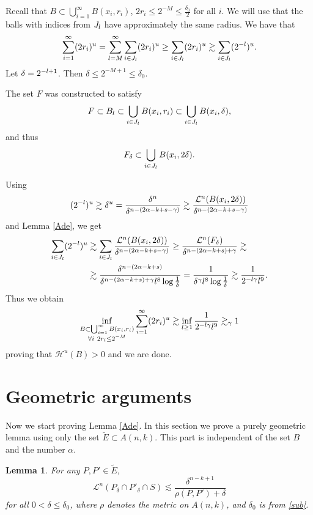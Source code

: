 \documentclass[a4paper]{amsart}
\newtheorem{lemma}[theorem]{Lemma}
\theoremstyle{definition} \newtheorem{remark}[theorem]{Remark}
\def\su{\subset}
\def\al{\alpha}
\def\ga{\gamma}
\def\de{\delta}
\def\ep{\varepsilon}
\def\ti{\widetilde}
\def\leb{\mathcal{L}}
\def\hau{\mathcal{H}}
\def\lkb{\lesssim}
\def\gkb{\gtrsim}
\begin{document}
Recall that $B \su \bigcup_{i=1}^{\infty} B(x_i,r_i)$, $2 r_i \leq 2^{-M} \leq \frac{\de_0}{2}$ for all $i$. 
We will use that the balls with indices from $J_{l}$ have approximately the same radius. We have that 
$$\sum_{i=1}^{\infty} (2 r_i)^u = \sum_{l=M}^{\infty} \sum_{i \in J_l} (2 r_i)^u \geq \sum_{i \in J_{\rc}} (2 r_i)^u \gkb 
\sum_{i \in J_{\rc }} (2^{-\rc})^u.$$
Let $\de=2^{-\rc+1}$. Then $\de \leq 2^{-M+1} \le \de_0$.
 
The set $F$ was constructed to satisfy 
$$F \su B_{\rc} \su \bigcup_{i \in J_{\rc}} B(x_i,r_i) \su \bigcup_{i \in J_{\rc}} B(x_i, \de),$$
and thus
$$F_{\de} \su \bigcup_{i \in J_{\rc}} B(x_i, 2 \de).$$

Using 
$$(2^{-\rc})^u \gkb \de^u = \frac{\de^n}{\de^{n-(2\al-k+s-\ga)}} \gkb \frac{\leb^n(B(x_i,2\de))}{\de^{n-(2\al-k+s-\ga)}}$$ 
and Lemma \ref{Ade}, we get 
\begin{align*}
\sum_{i \in J_{\rc}} (2^{-\rc})^u 
& \gkb \sum_{i \in J_{\rc}} 
 \frac{\leb^n(B(x_i,2\de))}{\de^{n-(2\al-k+s-\ga)}} 
 \geq 
\frac{\leb^n(F_{\de})}{\de^{n-(2\al-k+s)+\ga}} \gkb \\
& \gkb \frac{\de^{n-(2\al-k+s)}}{\de^{n-(2\al-k+s)+\ga} \rc^8 \log \frac{1}{\de}}=
\frac{1}{\de^{\ga} \rc^8 \log \frac{1}{\de}} \gkb \frac{1}{2^{-\rc \ga} \rc^9}.
\end{align*}
Thus we obtain
$$\inf_{\substack{B \su \bigcup_{i=1}^{\infty} B(x_i,r_i)\\ \forall i\ 2 r_i \leq 2^{-M}}} 
\sum_{i=1}^{\infty} (2 r_i)^u \gkb
\inf_{\rc \ge 1} \frac{1}{2^{-\rc \ga} \rc^9} \gkb_{\ga} 1$$
proving that $\hau^u(B)>0$ and we are done. 

\section{Geometric arguments}
\label{codd}
Now we start proving Lemma \ref{Ade}. In this section we prove a purely geometric lemma using only the set $\ti{E} \su A(n,k)$. 
This part is independent of the set $B$ and the number $\al$. 

\begin{lemma}
\label{gengeo}
For any $P, P' \in \ti{E}$, 
\begin{equation}
\label{zz1}
\leb^n(P_{\de} \cap P'_{\de} \cap S) \lkb \frac{\de^{n-k+1}}{\rho(P,P')+\de}
\end{equation}
 for all $0 < \de \leq \de_0$, where $\rho$ denotes the metric on $A(n,k)$, and $\de_0$ is from \eqref{sub}.

\end{lemma}
\end{document}
